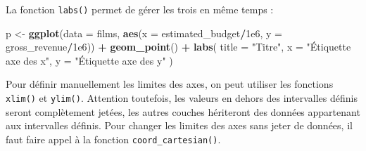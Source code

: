\documentclass[
  11pt,
]{book}
\newenvironment{Shaded}{\begin{snugshade}}{\end{snugshade}}
\newcommand{\DataTypeTok}[1]{\textcolor[rgb]{0.13,0.29,0.53}{#1}}
\newcommand{\FloatTok}[1]{\textcolor[rgb]{0.00,0.00,0.81}{#1}}
\newcommand{\KeywordTok}[1]{\textcolor[rgb]{0.13,0.29,0.53}{\textbf{#1}}}
\newcommand{\NormalTok}[1]{#1}
\newcommand{\OperatorTok}[1]{\textcolor[rgb]{0.81,0.36,0.00}{\textbf{#1}}}
\newcommand{\StringTok}[1]{\textcolor[rgb]{0.31,0.60,0.02}{#1}}
\numberwithin{equation}{section}
\numberwithin{countremarque}{section}
\begin{document}
La fonction \texttt{labs()} permet de gérer les trois en même temps :

\begin{Shaded}
\begin{Highlighting}[]
\NormalTok{p \textless{}{-}}\StringTok{ }\KeywordTok{ggplot}\NormalTok{(}\DataTypeTok{data =}\NormalTok{ films,}
            \KeywordTok{aes}\NormalTok{(}\DataTypeTok{x =}\NormalTok{ estimated\_budget}\OperatorTok{/}\FloatTok{1e6}\NormalTok{,}
                \DataTypeTok{y =}\NormalTok{ gross\_revenue}\OperatorTok{/}\FloatTok{1e6}\NormalTok{)) }\OperatorTok{+}
\StringTok{  }\KeywordTok{geom\_point}\NormalTok{() }\OperatorTok{+}
\StringTok{  }\KeywordTok{labs}\NormalTok{(}
    \DataTypeTok{title =} \StringTok{"Titre"}\NormalTok{,}
    \DataTypeTok{x =} \StringTok{"Étiquette axe des x"}\NormalTok{,}
    \DataTypeTok{y =} \StringTok{"Étiquette axe des y"}
\NormalTok{  )}
\end{Highlighting}
\end{Shaded}

Pour définir manuellement les limites des axes, on peut utiliser les fonctions \texttt{xlim()} et \texttt{ylim()}. Attention toutefois, les valeurs en dehors des intervalles définis seront complètement jetées, les autres couches hériteront des données appartenant aux intervalles définis. Pour changer les limites des axes sans jeter de données, il faut faire appel à la fonction \texttt{coord\_cartesian()}.
\end{document}
